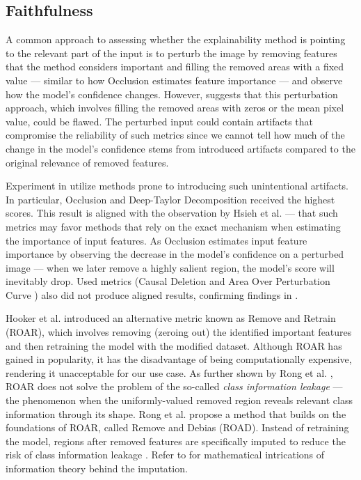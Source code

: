 \subsection*{Faithfulness}

A common approach to assessing whether the explainability method is pointing to the relevant part of the input is to perturb the image by removing features that the method considers important and filling the removed areas with a fixed value  --- similar to how Occlusion estimates feature importance --- and observe how the model's confidence changes.
However, \cite{roar} suggests that this perturbation approach, which involves filling the removed areas with zeros or the mean pixel value, could be flawed.
The perturbed input could contain artifacts that compromise the reliability of such metrics since we cannot tell how much of the change in the model's confidence stems from introduced artifacts compared to the original relevance of removed features.

Experiment in \cite{gallo} utilize methods prone to introducing such unintentional artifacts.
In particular, Occlusion and Deep-Taylor Decomposition \cite{xai-dtd} received the highest scores.
This result is aligned with the observation by Hsieh et al. \cite{xai-hsieh-occ-dtd} --- that such metrics may favor methods that rely on the exact mechanism when estimating the importance of input features.
As Occlusion estimates input feature importance by observing the decrease in the model's confidence on a perturbed image --- when we later remove a highly salient region, the model's score will inevitably drop.
Used metrics (Causal Deletion \cite{xai-causal-deletion} and Area Over Perturbation Curve \cite{xai-aopc}) also did not produce aligned results, confirming findings in \cite{roar}.

Hooker et al. \cite{roar} introduced an alternative metric known as Remove and Retrain (ROAR), which involves removing (zeroing out) the identified important features and then retraining the model with the modified dataset.
Although ROAR has gained in popularity, it has the disadvantage of being computationally expensive, rendering it unacceptable for our use case.
As further shown by Rong et al. \cite{road}, ROAR does not solve the problem of the so-called \emph{class information leakage} --- the phenomenon when the uniformly-valued removed region reveals relevant class information through its shape.
Rong et al. propose a method that builds on the foundations of ROAR, called Remove and Debias (ROAD).
Instead of retraining the model, regions after removed features are specifically imputed to reduce the risk of class information leakage \cite{road}.
Refer to \cite{road} for mathematical intrications of information theory behind the imputation.

